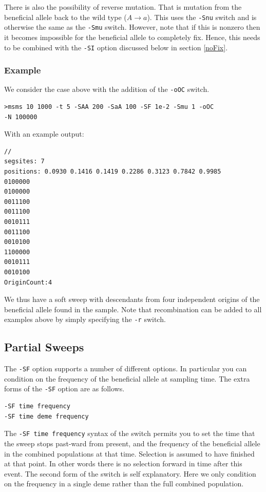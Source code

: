 \documentclass{article}
\begin{document}
There is also the possibility of reverse mutation. That is mutation from the
beneficial allele back to the wild type ($A \to a$). This uses the {\tt -Snu}
switch and is otherwise the same as the {\tt -Smu} switch. However, note that if this is
nonzero then it becomes impossible for the beneficial allele to completely fix.
Hence, this needs to be combined with the {\tt -SI} option discussed below in
section \ref{noFix}.

\subsubsection{Example} 

We consider the case above with the addition of the {\tt -oOC} switch.
\begin{verbatim}
>msms 10 1000 -t 5 -SAA 200 -SaA 100 -SF 1e-2 -Smu 1 -oOC 
-N 100000 
\end{verbatim}
With an example output:
\begin{verbatim}
//
segsites: 7
positions: 0.0930 0.1416 0.1419 0.2286 0.3123 0.7842 0.9985
0100000
0100000
0011100
0011100
0010111
0011100
0010100
1100000
0010111
0010100
OriginCount:4
\end{verbatim}
We thus have a soft sweep with descendants from four independent origins of the
beneficial allele found in the sample. Note that recombination can be added to
all examples above by simply specifying the {\tt -r} switch. 

\subsection{Partial Sweeps}

The {\tt -SF} option supports a number of different options. In particular you
can condition on the frequency of the beneficial allele at sampling time. The
extra forms of the {\tt -SF} option are as follows.
\begin{verbatim}
-SF time frequency
-SF time deme frequency
\end{verbatim}
The {\tt -SF time frequency} syntax of the switch permits you to set the time
that the sweep stops past-ward from present, and the frequency of the beneficial
allele in the combined populations at that time. Selection is assumed to have
finished at that point. In other words there is no selection forward in time
after this event. The second form of the switch is self explanatory. Here we only condition on the
frequency in a single deme rather than the full combined population. 
\end{document}
